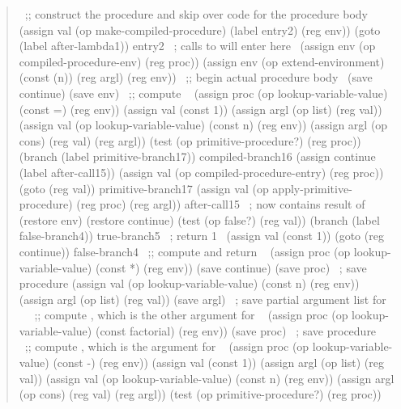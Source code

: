 \begin{quote}
\begin{smallscheme}
~\textrm{;; construct the procedure and skip over code for the procedure body}~
  (assign val
          (op make-compiled-procedure)
          (label entry2)
          (reg env))
  (goto (label after-lambda1))
entry2     ~\textrm{; calls to  will enter here}~
  (assign env (op compiled-procedure-env) (reg proc))
  (assign env
          (op extend-environment)
          (const (n))
          (reg argl)
          (reg env))
~\textrm{;; begin actual procedure body}~
  (save continue)
  (save env)
~\textrm{;; compute }~
  (assign proc
          (op lookup-variable-value)
          (const =)
          (reg env))
  (assign val (const 1))
  (assign argl (op list) (reg val))
  (assign val
          (op lookup-variable-value)
          (const n)
          (reg env))
  (assign argl (op cons) (reg val) (reg argl))
  (test (op primitive-procedure?) (reg proc))
  (branch (label primitive-branch17))
compiled-branch16
  (assign continue (label after-call15))
  (assign val (op compiled-procedure-entry) (reg proc))
  (goto (reg val))
primitive-branch17
  (assign val
          (op apply-primitive-procedure)
          (reg proc)
          (reg argl))
after-call15   ~\textrm{;  now contains result of }~
  (restore env)
  (restore continue)
  (test (op false?) (reg val))
  (branch (label false-branch4))
true-branch5  ~\textrm{; return 1}~
  (assign val (const 1))
  (goto (reg continue))
false-branch4
~\textrm{;; compute and return }~
  (assign proc
          (op lookup-variable-value)
          (const *)
          (reg env))
  (save continue)
  (save proc)   ~\textrm{; save \code{*}}~ procedure
  (assign val
          (op lookup-variable-value)
          (const n)
          (reg env))
  (assign argl (op list) (reg val))
  (save argl)   ~\textrm{; save partial argument list for \code{*}}~
~\textrm{;; compute , which is the other argument for \code{*}}~
  (assign proc
          (op lookup-variable-value)
          (const factorial)
          (reg env))
  (save proc)  ~\textrm{; save  procedure}~
~\textrm{;; compute , which is the argument for }~
  (assign proc
          (op lookup-variable-value)
          (const -)
          (reg env))
  (assign val (const 1))
  (assign argl (op list) (reg val))
  (assign val
          (op lookup-variable-value)
          (const n)
          (reg env))
  (assign argl (op cons) (reg val) (reg argl))
  (test (op primitive-procedure?) (reg proc))

\end{smallscheme}
\end{quote}
